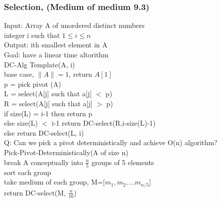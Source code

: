 \documentclass[10pt,usletter]{article}
\newcommand{\tab}[1][1cm]{\hspace*{#1}}
\begin{document}
\subsubsection{Selection, (Medium of medium 9.3)}
Input: Array A of unordered distinct numbers\\
\tab integer i such that $1 \leq i \leq n$\\
Output: ith smallest element in A\\
Goal: have a linear time altorithm\\
DC-Alg Template(A, i)\\
\tab base case, $\|A\|=1$, return $A[1]$\\
\tab p = pick pivot (A)\\
\tab L = select(A[j] such that a[j] $<$ p)\\
\tab R = select(A[j] such that a[j] $>$ p)\\
\tab if size(L) = i-1 then return p\\
\tab else size(L) $<$ i-1 return DC-select(R,i-size(L)-1)\\
\tab else return DC-select(L, i)\\

Q: Can we pick a pivot deterministically and achieve O(n) algorithm?\\
Pick-Pivot-Deterministically(A of size n)\\
\tab break A conceptually into $\frac{n}{5}$ groups of 5 elements\\
\tab sort each group\\
\tab take medium of each group, M=[$m_1,m_2,...m_{n/5}$]\\
\tab return DC-select(M, $\frac{n}{10}$)
\end{document}
